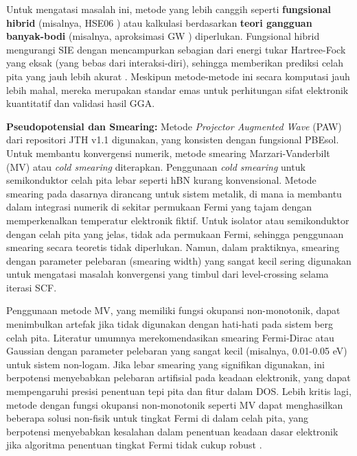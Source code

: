 Untuk mengatasi masalah ini, metode yang lebih canggih seperti \textbf{fungsional hibrid} (misalnya, HSE06 \citep{Krukau2006}) atau kalkulasi berdasarkan \textbf{teori gangguan banyak-bodi} (misalnya, aproksimasi GW \citep{Hedin1965}) diperlukan. Fungsional hibrid mengurangi SIE dengan mencampurkan sebagian dari energi tukar Hartree-Fock yang eksak (yang bebas dari interaksi-diri), sehingga memberikan prediksi celah pita yang jauh lebih akurat \citep{Heyd2003}. Meskipun metode-metode ini secara komputasi jauh lebih mahal, mereka merupakan standar emas untuk perhitungan sifat elektronik kuantitatif dan validasi hasil GGA.

\textbf{Pseudopotensial dan Smearing:} Metode \textit{Projector Augmented Wave} (PAW) \citep{Blochl1994, Kresse1999} dari repositori JTH v1.1 digunakan, yang konsisten dengan fungsional PBEsol. Untuk membantu konvergensi numerik, metode smearing Marzari-Vanderbilt (MV) atau \textit{cold smearing} \citep{marzari1997} diterapkan. Penggunaan \textit{cold smearing} untuk semikonduktor celah pita lebar seperti hBN kurang konvensional. Metode smearing pada dasarnya dirancang untuk sistem metalik, di mana ia membantu dalam integrasi numerik di sekitar permukaan Fermi yang tajam dengan memperkenalkan temperatur elektronik fiktif. Untuk isolator atau semikonduktor dengan celah pita yang jelas, tidak ada permukaan Fermi, sehingga penggunaan smearing secara teoretis tidak diperlukan. Namun, dalam praktiknya, smearing dengan parameter pelebaran (smearing width) yang sangat kecil sering digunakan untuk mengatasi masalah konvergensi yang timbul dari level-crossing selama iterasi SCF.

Penggunaan metode MV, yang memiliki fungsi okupansi non-monotonik, dapat menimbulkan artefak jika tidak digunakan dengan hati-hati pada sistem berg celah pita. Literatur umumnya merekomendasikan smearing Fermi-Dirac atau Gaussian dengan parameter pelebaran yang sangat kecil (misalnya, 0.01-0.05 eV) untuk sistem non-logam. Jika lebar smearing yang signifikan digunakan, ini berpotensi menyebabkan pelebaran artifisial pada keadaan elektronik, yang dapat mempengaruhi presisi penentuan tepi pita dan fitur dalam DOS. Lebih kritis lagi, metode dengan fungsi okupansi non-monotonik seperti MV dapat menghasilkan beberapa solusi non-fisik untuk tingkat Fermi di dalam celah pita, yang berpotensi menyebabkan kesalahan dalam penentuan keadaan dasar elektronik jika algoritma penentuan tingkat Fermi tidak cukup robust \citep{marzari1997}.

